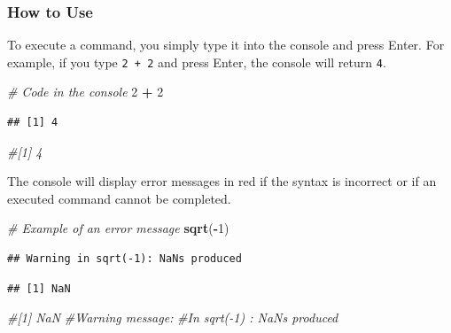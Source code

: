 \documentclass[
  b5paper]{book}
\newenvironment{Shaded}{\begin{snugshade}}{\end{snugshade}}
\newcommand{\CommentTok}[1]{\textcolor[rgb]{0.56,0.35,0.01}{\textit{#1}}}
\newcommand{\DecValTok}[1]{\textcolor[rgb]{0.00,0.00,0.81}{#1}}
\newcommand{\FunctionTok}[1]{\textcolor[rgb]{0.13,0.29,0.53}{\textbf{#1}}}
\newcommand{\NormalTok}[1]{#1}
\newcommand{\SpecialCharTok}[1]{\textcolor[rgb]{0.81,0.36,0.00}{\textbf{#1}}}
\begin{document}
\hypertarget{how-to-use}{%
\subsubsection*{How to Use}\label{how-to-use}}

To execute a command, you simply type it into the console and press Enter. For example, if you type \texttt{2\ +\ 2} and press Enter, the console will return \texttt{4}.

\begin{Shaded}
\begin{Highlighting}[]
\CommentTok{\# Code in the console}
\DecValTok{2} \SpecialCharTok{+} \DecValTok{2}
\end{Highlighting}
\end{Shaded}

\begin{verbatim}
## [1] 4
\end{verbatim}

\begin{Shaded}
\begin{Highlighting}[]
\CommentTok{\#[1] 4}
\end{Highlighting}
\end{Shaded}

The console will display error messages in red if the syntax is incorrect or if an executed command cannot be completed.

\begin{Shaded}
\begin{Highlighting}[]
\CommentTok{\# Example of an error message}
\FunctionTok{sqrt}\NormalTok{(}\SpecialCharTok{{-}}\DecValTok{1}\NormalTok{)}
\end{Highlighting}
\end{Shaded}

\begin{verbatim}
## Warning in sqrt(-1): NaNs produced
\end{verbatim}

\begin{verbatim}
## [1] NaN
\end{verbatim}

\begin{Shaded}
\begin{Highlighting}[]
\CommentTok{\#[1] NaN}
\CommentTok{\#Warning message:}
\CommentTok{\#In sqrt({-}1) : NaNs produced}
\end{Highlighting}
\end{Shaded}
\end{document}
